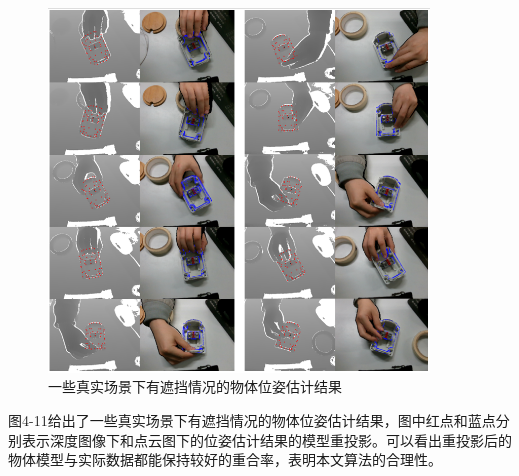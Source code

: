 \begin{figure}[htb]
	\centering 
	\includegraphics[width=0.9\textwidth]{./mypic/71.png} 
	\caption{一些真实场景下有遮挡情况的物体位姿估计结果} 
\end{figure}

图4-11给出了一些真实场景下有遮挡情况的物体位姿估计结果，图中红点和蓝点分别表示深度图像下和点云图下的位姿估计结果的模型重投影。可以看出重投影后的物体模型与实际数据都能保持较好的重合率，表明本文算法的合理性。

















